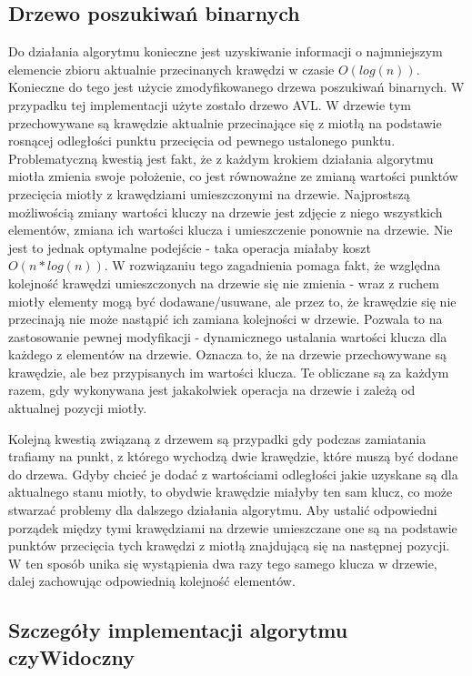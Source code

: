 \documentclass{article}
\begin{document}
\subsection{Drzewo poszukiwań binarnych}
\qquad Do działania algorytmu konieczne jest uzyskiwanie informacji o najmniejszym elemencie zbioru aktualnie przecinanych krawędzi w czasie $O(log(n))$. Konieczne do tego jest użycie zmodyfikowanego drzewa poszukiwań binarnych. W przypadku tej implementacji użyte zostało drzewo AVL. W drzewie tym przechowywane są krawędzie aktualnie przecinające się z miotłą na podstawie rosnącej odległości punktu przecięcia od pewnego ustalonego punktu. Problematyczną kwestią jest fakt, że z każdym krokiem działania algorytmu miotła zmienia swoje położenie, co jest równoważne ze zmianą wartości punktów przecięcia miotły z krawędziami umieszczonymi na drzewie. Najprostszą możliwością zmiany wartości kluczy na drzewie jest zdjęcie z niego wszystkich elementów, zmiana ich wartości klucza i umieszczenie ponownie na drzewie. Nie jest to jednak optymalne podejście - taka operacja miałaby koszt $O(n*log(n))$. W rozwiązaniu tego zagadnienia pomaga fakt, że względna kolejność krawędzi umieszczonych na drzewie się nie zmienia - wraz z ruchem miotły elementy mogą być dodawane/usuwane, ale przez to, że krawędzie się nie przecinają nie może nastąpić ich zamiana kolejności w drzewie. Pozwala to na zastosowanie pewnej modyfikacji - dynamicznego ustalania wartości klucza dla każdego z elementów na drzewie. Oznacza to, że na drzewie przechowywane są krawędzie, ale bez przypisanych im wartości klucza. Te obliczane są za każdym razem, gdy wykonywana jest jakakolwiek operacja na drzewie i zależą od aktualnej pozycji miotły.

\noindent \qquad Kolejną kwestią związaną z drzewem są przypadki gdy podczas zamiatania trafiamy na punkt, z którego wychodzą dwie krawędzie, które muszą być dodane do drzewa. Gdyby chcieć je dodać z wartościami odległości jakie uzyskane są dla aktualnego stanu miotły, to obydwie krawędzie miałyby ten sam klucz, co może stwarzać problemy dla dalszego działania algorytmu. Aby ustalić odpowiedni porządek między tymi krawędziami na drzewie umieszczane one są na podstawie punktów przecięcia tych krawędzi z miotłą znajdującą się na następnej pozycji. W ten sposób unika się wystąpienia dwa razy tego samego klucza w drzewie, dalej zachowując odpowiednią kolejność elementów.

\subsection{Szczegóły implementacji algorytmu \textbf{czyWidoczny}}
\end{document}
